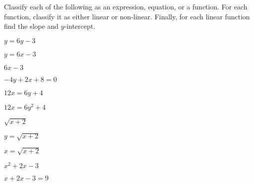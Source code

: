 \begin{activity}\label{A:0.1.5}
    Classify each of the following as an expression, equation, or a function.  For each
    function, classify it as either linear or non-linear.  Finally, for each linear
    function find the slope and $y$-intercept.
    \ba
    \item $y=6y-3$
    \item $y=6x-3$
    \item $6x-3$
    \item $-4y+2x+8=0$
    \item $12x=6y+4$
    \item $12x=6y^2+4$
    \item $\sqrt{x+2}$
    \item $y=\sqrt{x+2}$
    \item $x=\sqrt{x+2}$
    \item $x^2+2x-3$
    \item $x+2x-3=9$
    \ea

\end{activity}\aftera
